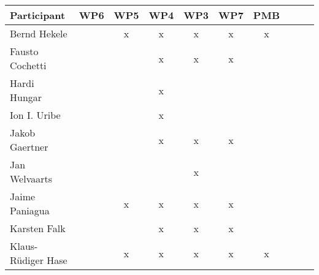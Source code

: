 \documentclass[a4paper, 11pt]{article}
\begin{document}
\begin{tabular}{|l|c|c|c||c|c|c||c|c|c|}
\hline
\textbf{Participant} & \textbf{WP6} &  \textbf{WP5} & \textbf{WP4}&  \textbf{WP3} & \textbf{WP7}&  \textbf{PMB} \\\hline
Bernd Hekele         &   & x & x & x & x & x \\\hline
Fausto Cochetti      &   &   & x & x & x &   \\\hline
Hardi Hungar         &   &   & x &   &   &   \\\hline
Ion I. Uribe         &   &   & x &   &   &   \\\hline
Jakob Gaertner       &   &   & x & x & x &   \\\hline
Jan Welvaarts        &  &  &   & x  &   &   \\\hline
Jaime Paniagua       &  & x & x & x & x &    \\\hline
Karsten Falk         &  &   & x & x & x &   \\\hline
Klaus-R\"udiger Hase &  & x & x & x & x & x \\\hline

\end{tabular}
\end{document}

